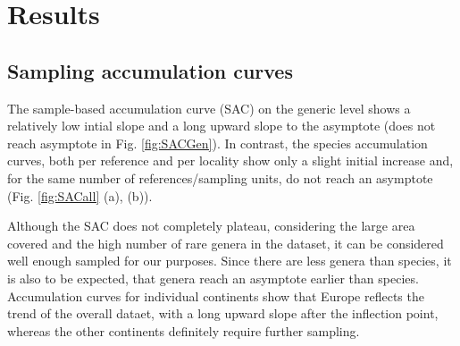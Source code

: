 \section{Results}


\subsection{Sampling accumulation curves}
The sample-based accumulation curve (SAC) on the generic level shows a relatively low intial slope and a long upward slope to the asymptote (does not reach asymptote in Fig. \ref{fig:SACGen}). In contrast, the species accumulation curves, both per reference and per locality show only a slight initial increase and, for the same number of references/sampling units, do not reach an asymptote (Fig. \ref{fig:SACall} (a), (b)).

Although the SAC does not completely plateau, considering the large area covered and the high number of rare genera in the dataset, it can be considered well enough sampled for our purposes. Since there are less genera than species, it is also to be expected, that genera reach an asymptote earlier than species.
Accumulation curves for individual continents show that Europe reflects the trend of the overall dataet, with a long upward slope after the inflection point, whereas the other continents definitely require further sampling.



